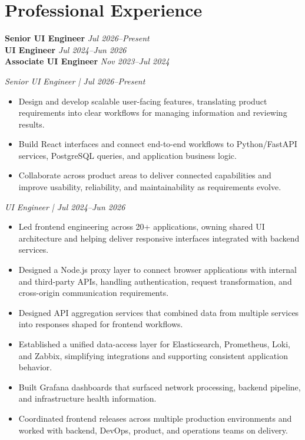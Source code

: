 \section{Professional Experience}

\textbf{Senior UI Engineer} \hfill \textit{Jul 2026--Present}\\[-2pt]
\textbf{UI Engineer} \hfill \textit{Jul 2024--Jun 2026}\\[-2pt]
\textbf{Associate UI Engineer} \hfill \textit{Nov 2023--Jul 2024}

\textit{Senior UI Engineer | Jul 2026--Present}
\begin{itemize}
  \item Design and develop scalable user-facing features, translating product
  requirements into clear workflows for managing information and reviewing
  results.
  \item Build React interfaces and connect end-to-end workflows to
  Python/FastAPI services, PostgreSQL queries, and application business logic.
  \item Collaborate across product areas to deliver connected capabilities and
  improve usability, reliability, and maintainability as requirements evolve.
\end{itemize}

\textit{UI Engineer | Jul 2024--Jun 2026}
\begin{itemize}
  \item Led frontend engineering across 20+ applications, owning shared UI
  architecture and helping deliver responsive interfaces integrated with
  backend services.
  \item Designed a Node.js proxy layer to connect browser applications with
  internal and third-party APIs, handling authentication, request
  transformation, and cross-origin communication requirements.
  \item Designed API aggregation services that combined data from multiple
  services into responses shaped for frontend workflows.
  \item Established a unified data-access layer for Elasticsearch, Prometheus,
  Loki, and Zabbix, simplifying integrations and supporting consistent
  application behavior.
  \item Built Grafana dashboards that surfaced network processing, backend
  pipeline, and infrastructure health information.
  \item Coordinated frontend releases across multiple production environments
  and worked with backend, DevOps, product, and operations teams on delivery.
\end{itemize}

